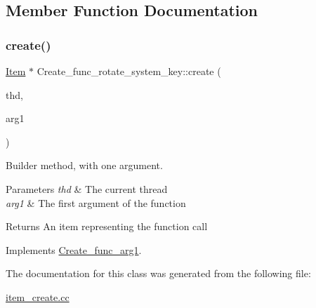 \subsection{Member Function Documentation}
\mbox{\label{classCreate__func__rotate__system__key_a91d8638f781e106e853c3630ce7803dd}} 
\subsubsection{\texorpdfstring{create()}{create()}}
{\footnotesize\ttfamily \mbox{\hyperlink{classItem}{Item}} $\ast$ Create\+\_\+func\+\_\+rotate\+\_\+system\+\_\+key\+::create (\begin{DoxyParamCaption}\item[{T\+HD $\ast$}]{thd,  }\item[{\mbox{\hyperlink{classItem}{Item}} $\ast$}]{arg1 }\end{DoxyParamCaption})\hspace{0.3cm}{\ttfamily [virtual]}}

Builder method, with one argument. 
\begin{DoxyParams}{Parameters}
{\em thd} & The current thread \\
\hline
{\em arg1} & The first argument of the function \\
\hline
\end{DoxyParams}
\begin{DoxyReturn}{Returns}
An item representing the function call 
\end{DoxyReturn}


Implements \mbox{\hyperlink{classCreate__func__arg1_a3e9a98f755cd82c3e762e334c955a8c9}{Create\+\_\+func\+\_\+arg1}}.



The documentation for this class was generated from the following file\+:\begin{DoxyCompactItemize}
\item 
\mbox{\hyperlink{item__create_8cc}{item\+\_\+create.\+cc}}\end{DoxyCompactItemize}
